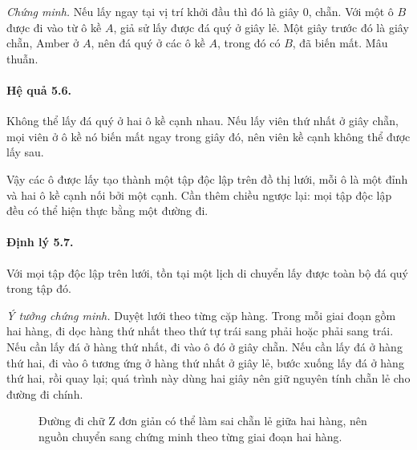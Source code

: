 \documentclass[11pt]{article}
\begin{document}
\emph{Chứng minh.}
Nếu lấy ngay tại vị trí khởi đầu thì đó là giây \(0\), chẵn. Với một ô \(B\)
được đi vào từ ô kề \(A\), giả sử lấy được đá quý ở giây lẻ. Một giây trước
đó là giây chẵn, Amber ở \(A\), nên đá quý ở các ô kề \(A\), trong đó có
\(B\), đã biến mất. Mâu thuẫn.

\paragraph{Hệ quả 5.6.}
Không thể lấy đá quý ở hai ô kề cạnh nhau. Nếu lấy viên thứ nhất ở giây chẵn,
mọi viên ở ô kề nó biến mất ngay trong giây đó, nên viên kề cạnh không thể
được lấy sau.

Vậy các ô được lấy tạo thành một tập độc lập trên đồ thị lưới, mỗi ô là một
đỉnh và hai ô kề cạnh nối bởi một cạnh. Cần thêm chiều ngược lại: mọi tập độc
lập đều có thể hiện thực bằng một đường đi.

\paragraph{Định lý 5.7.}
Với mọi tập độc lập trên lưới, tồn tại một lịch di chuyển lấy được toàn bộ đá
quý trong tập đó.

\emph{Ý tưởng chứng minh.}
Duyệt lưới theo từng cặp hàng. Trong mỗi giai đoạn gồm hai hàng, đi dọc hàng
thứ nhất theo thứ tự trái sang phải hoặc phải sang trái. Nếu cần lấy đá ở
hàng thứ nhất, đi vào ô đó ở giây chẵn. Nếu cần lấy đá ở hàng thứ hai, đi
vào ô tương ứng ở hàng thứ nhất ở giây lẻ, bước xuống lấy đá ở hàng thứ hai,
rồi quay lại; quá trình này dùng hai giây nên giữ nguyên tính chẵn lẻ cho
đường đi chính.

\begin{figure}[htbp]
\centering
{}
\caption{Đường đi chữ Z đơn giản có thể làm sai chẵn lẻ giữa hai hàng, nên
nguồn chuyển sang chứng minh theo từng giai đoạn hai hàng.}
\end{figure}
\end{document}
